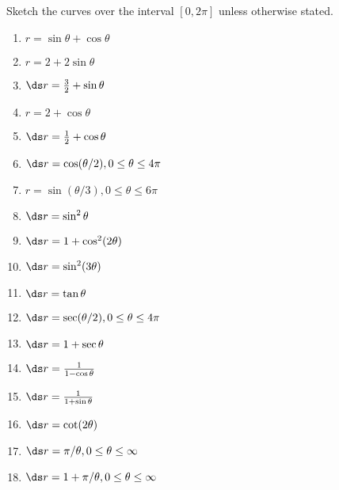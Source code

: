 \begin{enumialphparenastyle}
\begin{ex}
\noindent Sketch the curves over the interval $[0,2\pi]$ unless
otherwise stated.
\begin{multicols}{3}
\begin{enumerate}
	\item	$r=\sin\theta+\cos\theta$
	\item	$r=2+2\sin\theta$
	\item	$\ds r={3\over2}+\sin\theta$
	\item	$r= 2+\cos\theta$
	\item	$\ds r={1\over2}+\cos\theta$
	\item	$\ds r=\cos(\theta/2), 0\le\theta\le4\pi$
	\item	$r=\sin(\theta/3), 0\le\theta\le6\pi$
	\item	$\ds r=\sin^2\theta$
	\item	$\ds r=1+\cos^2(2\theta)$
	\item	$\ds r=\sin^2(3\theta)$
	\item	$\ds r=\tan\theta$
	\item	$\ds r=\sec(\theta/2), 0\le\theta\le4\pi$
	\item	$\ds r=1+\sec\theta$
	\item	$\ds r={1\over 1-\cos\theta}$
	\item	$\ds r={1\over 1+\sin\theta}$
	\item	$\ds r=\cot(2\theta)$
	\item	$\ds r=\pi/\theta, 0\le\theta\le\infty$
	\item	$\ds r=1+\pi/\theta, 0\le\theta\le\infty$
\end{enumerate}
\end{multicols}
\end{ex}

\end{enumialphparenastyle}

